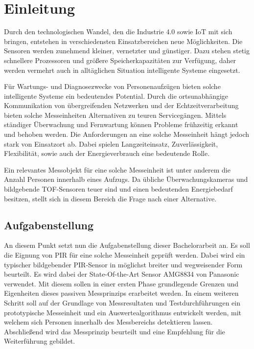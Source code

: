 \chapter{Einleitung}
\label{chap:Einleitung}


\label{sec:Ausgangssituation}
Durch den technologischen Wandel, den die Industrie 4.0 sowie \ac{IoT}  mit sich bringen, entstehen in verschiedensten Einsatzbereichen neue Möglichkeiten. Die Sensoren werden zunehmend kleiner, vernetzter und günstiger. Dazu stehen stetig schnellere Prozessoren und größere Speicherkapazitäten zur Verfügung, daher werden vermehrt auch in alltäglichen Situation intelligente Systeme eingesetzt. 

Für Wartungs- und Diagnosezwecke von Personenaufzügen bieten solche intelligente Systeme ein bedeutendes Potential. Durch die ortsunabhängige Kommunikation von übergreifenden Netzwerken und der Echtzeitverarbeitung bieten solche Messeinheiten Alternativen zu teuren Servicegängen. Mittels ständiger Überwachung und Fernwartung können Probleme frühzeitig erkannt und behoben werden. Die Anforderungen an eine solche Messeinheit hängt jedoch stark von Einsatzort ab. Dabei spielen Langzeiteinsatz, Zuverlässigkeit, Flexibilität, sowie auch der Energieverbrauch eine bedeutende Rolle.

Ein relevantes Messobjekt für eine solche Messeinheit ist unter anderem die Anzahl Personen innerhalb eines Aufzugs. Da übliche Überwachungskameras und bildgebende TOF-Sensoren teuer sind und einen bedeutenden Energiebedarf besitzen, stellt sich in diesem Bereich die Frage nach einer Alternative.

\section{Aufgabenstellung}
\label{chap:Aufgabenstellung}
An diesem Punkt setzt nun die Aufgabenstellung dieser Bachelorarbeit an. Es soll die Eignung von \ac{PIR} für eine solche Messeinheit geprüft werden. Dabei wird ein typischer bildgebender PIR-Sensor in möglichst breiter und wegweisender Form beurteilt. Es wird dabei der State-Of-the-Art Sensor AMG8834 von Panasonic verwendet. Mit diesem sollen in einer ersten Phase grundlegende Grenzen und Eigenheiten dieses passiven Messprinzips erarbeitet werden. In einem weiteren Schritt soll auf der Grundlage von Messresultaten und Testdurchführungen ein prototypische Messeinheit und ein Auswertealgorithmus entwickelt werden, mit welchem sich Personen innerhalb des Messbereichs detektieren lassen. Abschließend wird das Messprinzip beurteilt und eine Empfehlung für die Weiterführung gebildet. 


